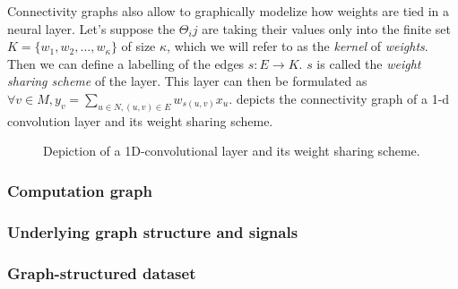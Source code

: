 

Connectivity graphs also allow to graphically modelize how weights are tied in a neural layer. Let's suppose the $\Theta_ij$ are taking their values only into the finite set $K = \{w_1, w_2, \ldots, w_\kappa\}$ of size $\kappa$, which we will refer to as the \emph{kernel} of \emph{weights}. Then we can define a labelling of the edges $s: E \rightarrow K$. $s$ is called the \emph{weight sharing scheme} of the layer. This layer can then be formulated as $\displaystyle \forall v \in M, y_v = \sum_{u \in N, (u,v) \in E} w_{s(u,v)} x_u$.  depicts the connectivity graph of a 1-d convolution layer and its weight sharing scheme.

\begin{figure}[h]
  \begin{center}
  \end{center}
  \caption{Depiction of a 1D-convolutional layer and its weight sharing scheme.}
  \label{cnn}
\end{figure}



\subsubsection{Computation graph}
\label{comp_graph}


\subsubsection{Underlying graph structure and signals}
\label{inductive_graph}

\subsubsection{Graph-structured dataset}
\label{transductive_graph}


